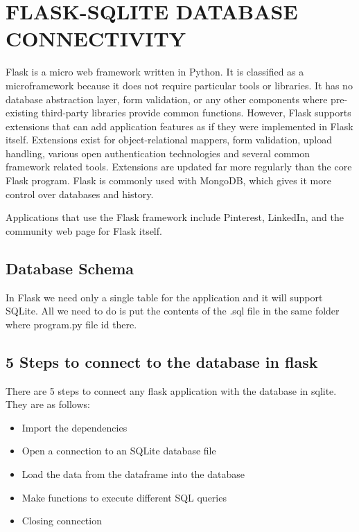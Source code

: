 \chapter{FLASK-SQLITE DATABASE CONNECTIVITY}
Flask is a micro web framework written in Python. It is classified as a microframework because it does not require particular tools or libraries. It has no database abstraction layer, form validation, or any other components where pre-existing third-party libraries provide common functions. However, Flask supports extensions that can add application features as if they were implemented in Flask itself. Extensions exist for object-relational mappers, form validation, upload handling, various open authentication technologies and several common framework related tools. Extensions are updated far more regularly than the core Flask program. Flask is commonly used with MongoDB, which gives it more control over databases and history.

Applications that use the Flask framework include Pinterest, LinkedIn, and the community web page for Flask itself.\\
\section{Database Schema}
In Flask we need only a single table for the application and it will support SQLite. All we need to do is put the contents of the .sql file in the same folder where program.py file id there.
\\
\section{5 Steps to connect to the database in flask}
There are 5 steps to connect any flask application with the database in sqlite. They are as follows: 
\begin{itemize}
\item{Import the dependencies }
\item{Open a connection to an SQLite database file} 
\item{Load the data from the dataframe into the database} 
\item{Make functions to execute different SQL queries} 
\item{Closing connection}
\end{itemize}


